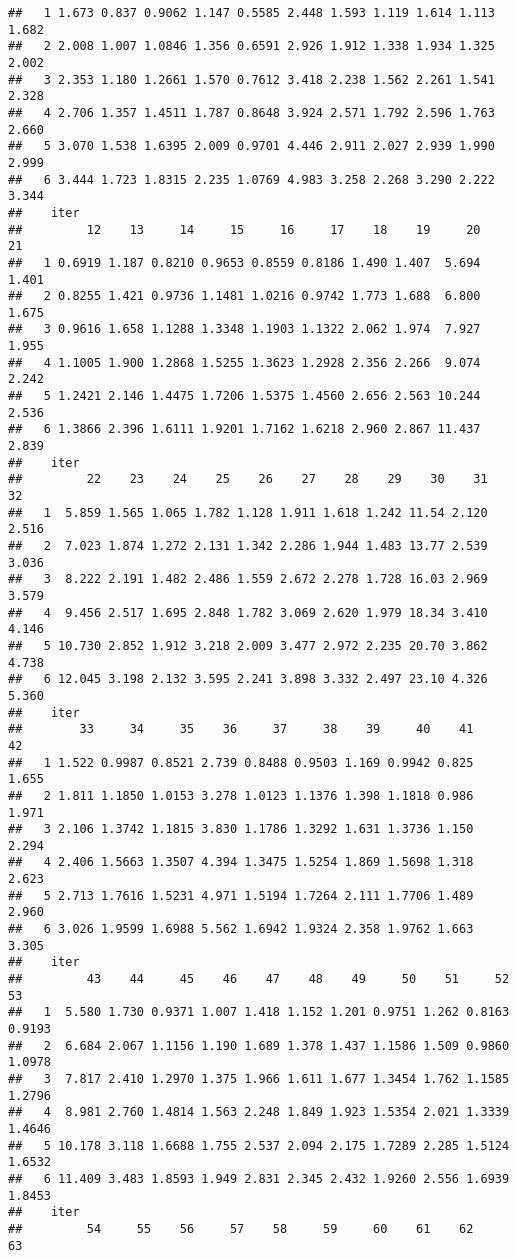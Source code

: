 \documentclass[a4paper,english,10pt]{article}\usepackage[]{graphicx}\usepackage[]{color}
\makeatletter
\newenvironment{kframe}{%
 \def\at@end@of@kframe{}%
 \ifinner\ifhmode%
  \def\at@end@of@kframe{\end{minipage}}%
  \begin{minipage}{\columnwidth}%
 \fi\fi%
 \def\FrameCommand##1{\hskip\@totalleftmargin \hskip-\fboxsep
 \colorbox{shadecolor}{##1}\hskip-\fboxsep
     \hskip-\linewidth \hskip-\@totalleftmargin \hskip\columnwidth}%
 \MakeFramed {\advance\hsize-\width
   \@totalleftmargin\z@ \linewidth\hsize
   \@setminipage}}%
 {\par\unskip\endMakeFramed%
 \at@end@of@kframe}
\newenvironment{knitrout}{}{} %
\makeatother
\begin{document}
\begin{knitrout}
\begin{kframe}
\begin{verbatim}
##   1 1.673 0.837 0.9062 1.147 0.5585 2.448 1.593 1.119 1.614 1.113 1.682
##   2 2.008 1.007 1.0846 1.356 0.6591 2.926 1.912 1.338 1.934 1.325 2.002
##   3 2.353 1.180 1.2661 1.570 0.7612 3.418 2.238 1.562 2.261 1.541 2.328
##   4 2.706 1.357 1.4511 1.787 0.8648 3.924 2.571 1.792 2.596 1.763 2.660
##   5 3.070 1.538 1.6395 2.009 0.9701 4.446 2.911 2.027 2.939 1.990 2.999
##   6 3.444 1.723 1.8315 2.235 1.0769 4.983 3.258 2.268 3.290 2.222 3.344
##    iter
##         12    13     14     15     16     17    18    19     20    21
##   1 0.6919 1.187 0.8210 0.9653 0.8559 0.8186 1.490 1.407  5.694 1.401
##   2 0.8255 1.421 0.9736 1.1481 1.0216 0.9742 1.773 1.688  6.800 1.675
##   3 0.9616 1.658 1.1288 1.3348 1.1903 1.1322 2.062 1.974  7.927 1.955
##   4 1.1005 1.900 1.2868 1.5255 1.3623 1.2928 2.356 2.266  9.074 2.242
##   5 1.2421 2.146 1.4475 1.7206 1.5375 1.4560 2.656 2.563 10.244 2.536
##   6 1.3866 2.396 1.6111 1.9201 1.7162 1.6218 2.960 2.867 11.437 2.839
##    iter
##         22    23    24    25    26    27    28    29    30    31    32
##   1  5.859 1.565 1.065 1.782 1.128 1.911 1.618 1.242 11.54 2.120 2.516
##   2  7.023 1.874 1.272 2.131 1.342 2.286 1.944 1.483 13.77 2.539 3.036
##   3  8.222 2.191 1.482 2.486 1.559 2.672 2.278 1.728 16.03 2.969 3.579
##   4  9.456 2.517 1.695 2.848 1.782 3.069 2.620 1.979 18.34 3.410 4.146
##   5 10.730 2.852 1.912 3.218 2.009 3.477 2.972 2.235 20.70 3.862 4.738
##   6 12.045 3.198 2.132 3.595 2.241 3.898 3.332 2.497 23.10 4.326 5.360
##    iter
##        33     34     35    36     37     38    39     40    41    42
##   1 1.522 0.9987 0.8521 2.739 0.8488 0.9503 1.169 0.9942 0.825 1.655
##   2 1.811 1.1850 1.0153 3.278 1.0123 1.1376 1.398 1.1818 0.986 1.971
##   3 2.106 1.3742 1.1815 3.830 1.1786 1.3292 1.631 1.3736 1.150 2.294
##   4 2.406 1.5663 1.3507 4.394 1.3475 1.5254 1.869 1.5698 1.318 2.623
##   5 2.713 1.7616 1.5231 4.971 1.5194 1.7264 2.111 1.7706 1.489 2.960
##   6 3.026 1.9599 1.6988 5.562 1.6942 1.9324 2.358 1.9762 1.663 3.305
##    iter
##         43    44     45    46    47    48    49     50    51     52     53
##   1  5.580 1.730 0.9371 1.007 1.418 1.152 1.201 0.9751 1.262 0.8163 0.9193
##   2  6.684 2.067 1.1156 1.190 1.689 1.378 1.437 1.1586 1.509 0.9860 1.0978
##   3  7.817 2.410 1.2970 1.375 1.966 1.611 1.677 1.3454 1.762 1.1585 1.2796
##   4  8.981 2.760 1.4814 1.563 2.248 1.849 1.923 1.5354 2.021 1.3339 1.4646
##   5 10.178 3.118 1.6688 1.755 2.537 2.094 2.175 1.7289 2.285 1.5124 1.6532
##   6 11.409 3.483 1.8593 1.949 2.831 2.345 2.432 1.9260 2.556 1.6939 1.8453
##    iter
##         54     55    56     57    58     59     60    61    62     63

\end{verbatim}
\end{kframe}
\end{knitrout}
\end{document}
